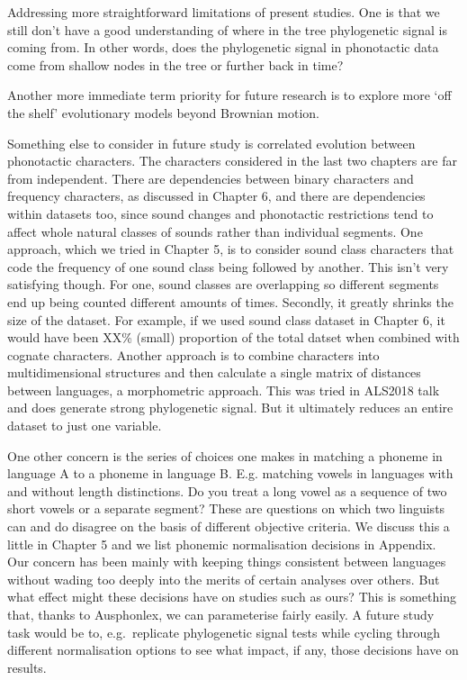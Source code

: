 Addressing more straightforward limitations of present studies. One is that we still don't have a good understanding of where in the tree phylogenetic signal is coming from. In other words, does the phylogenetic signal in phonotactic data come from shallow nodes in the tree or further back in time?

Another more immediate term priority for future research is to explore more `off the shelf' evolutionary models beyond Brownian motion.

Something else to consider in future study is correlated evolution between phonotactic characters. The characters considered in the last two chapters are far from independent. There are dependencies between binary characters and frequency characters, as discussed in Chapter 6, and there are dependencies within datasets too, since sound changes and phonotactic restrictions tend to affect whole natural classes of sounds rather than individual segments. One approach, which we tried in Chapter 5, is to consider sound class characters that code the frequency of one sound class being followed by another. This isn't very satisfying though. For one, sound classes are overlapping so different segments end up being counted different amounts of times. Secondly, it greatly shrinks the size of the dataset. For example, if we used sound class dataset in Chapter 6, it would have been XX\% (small) proportion of the total datset when combined with cognate characters. Another approach is to combine characters into multidimensional structures and then calculate a single matrix of distances between languages, a morphometric approach. This was tried in ALS2018 talk and does generate strong phylogenetic signal. But it ultimately reduces an entire dataset to just one variable.

One other concern is the series of choices one makes in matching a phoneme in language A to a phoneme in language B. E.g. matching vowels in languages with and without length distinctions. Do you treat a long vowel as a sequence of two short vowels or a separate segment? These are questions on which two linguists can and do disagree on the basis of different objective criteria. We discuss this a little in Chapter 5 and we list phonemic normalisation decisions in Appendix. Our concern has been mainly with keeping things consistent between languages without wading too deeply into the merits of certain analyses over others. But what effect might these decisions have on studies such as ours? This is something that, thanks to Ausphonlex, we can parameterise fairly easily. A future study task would be to, e.g.~replicate phylogenetic signal tests while cycling through different normalisation options to see what impact, if any, those decisions have on results.

